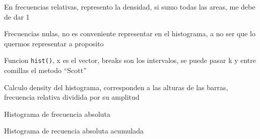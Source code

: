 \documentclass[
]{article}
\newenvironment{Shaded}{\begin{snugshade}}{\end{snugshade}}
\newcommand{\AttributeTok}[1]{\textcolor[rgb]{0.77,0.63,0.00}{#1}}
\newcommand{\ConstantTok}[1]{\textcolor[rgb]{0.00,0.00,0.00}{#1}}
\newcommand{\ControlFlowTok}[1]{\textcolor[rgb]{0.13,0.29,0.53}{\textbf{#1}}}
\newcommand{\DecValTok}[1]{\textcolor[rgb]{0.00,0.00,0.81}{#1}}
\newcommand{\FunctionTok}[1]{\textcolor[rgb]{0.00,0.00,0.00}{#1}}
\newcommand{\NormalTok}[1]{#1}
\newcommand{\OtherTok}[1]{\textcolor[rgb]{0.56,0.35,0.01}{#1}}
\newcommand{\SpecialCharTok}[1]{\textcolor[rgb]{0.00,0.00,0.00}{#1}}
\newcommand{\StringTok}[1]{\textcolor[rgb]{0.31,0.60,0.02}{#1}}
\begin{document}
En frecuencias relativas, represento la densidad, si sumo todas las
areas, me debe de dar 1

Frecuencias nulas, no es conveniente representar en el histograma, a no
ser que lo quermos representar a proposito

Funcion \texttt{hist()}, x es el vector, breaks son los intervalos, se
puede pasar k y entre comillas el metodo ``Scott''

Calculo density del histograma, corresponden a las alturas de las
barras, frecuencia relativa dividida por su amplitud

Histograma de frecuencia absoluta

\begin{Shaded}
\end{Shaded}

Histograma de recuencia absoluta acumulada
\end{document}
